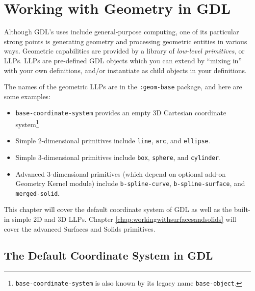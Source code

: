 \documentclass [11pt]{book}
\begin{document}
\chapter{Working with Geometry in GDL}

\label{chap:workingwithgeometryingdl}



Although GDL's uses include general-purpose computing, one of
  its particular strong points is generating geometry and processing
  geometric entities in various ways. Geometric capabilities are
  provided by a library of \emph{low-level primitives}, or LLPs. LLPs are pre-defined GDL objects which you can
	extend by ``mixing in'' with your own definitions, and/or
	instantiate as child objects in your definitions.



The names of the geometric LLPs are in the \texttt{:geom-base} package, and here are some examples:

\begin{itemize}

\item \texttt{base-coordinate-system} provides an empty 3D Cartesian coordinate system\footnote{\texttt{base-coordinate-system} is also known by its legacy name \texttt{base-object}.}

\item Simple 2-dimensional primitives include \texttt{line}, \texttt{arc}, and \texttt{ellipse}.

\item Simple 3-dimensional primitives include \texttt{box}, \texttt{sphere}, and \texttt{cylinder}.

\item Advanced 3-dimensional primitives (which depend on optional add-on Geometry Kernel module) include \texttt{b-spline-curve}, \texttt{b-spline-surface}, and \texttt{merged-solid}.

\end{itemize}

This chapter will cover the default coordinate system of GDL as well as the built-in simple 2D and 3D LLPs. Chapter 
\ref{chap:workingwithsurfacesandsolids} will cover the advanced Surfaces and Solids primitives.



\section{The Default Coordinate System in GDL}
\end{document}
